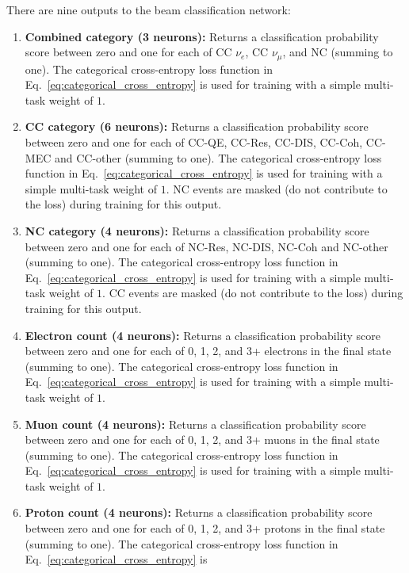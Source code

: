 There are nine outputs to the beam classification network:
\begin{enumerate}
    \item \textbf{Combined category (3 neurons):} Returns a classification probability score
          between zero and one for each of CC $\nu_{e}$, CC $\nu_{\mu}$, and NC (summing to one).
          The categorical cross-entropy loss function in Eq.~\ref{eq:categorical_cross_entropy} is
          used for training with a simple multi-task weight of $1$.
    \item \textbf{CC category (6 neurons):} Returns a classification probability score between
          zero and one for each of CC-QE, CC-Res, CC-DIS, CC-Coh, CC-MEC and CC-other (summing to
          one). The categorical cross-entropy loss function in
          Eq.~\ref{eq:categorical_cross_entropy} is used for training with a simple multi-task
          weight of $1$. NC events are masked (do not contribute to the loss) during training for
          this output.
    \item \textbf{NC category (4 neurons):} Returns a classification probability score between
          zero and one for each of NC-Res, NC-DIS, NC-Coh and NC-other (summing to one). The
          categorical cross-entropy loss function in Eq.~\ref{eq:categorical_cross_entropy} is
          used for training with a simple multi-task weight of $1$. CC events are masked (do not
          contribute to the loss) during training for this output.
    \item \textbf{Electron count (4 neurons):} Returns a classification probability score between
          zero and one for each of 0, 1, 2, and 3+ electrons in the final state (summing to one).
          The categorical cross-entropy loss function in Eq.~\ref{eq:categorical_cross_entropy} is
          used for training with a simple multi-task weight of $1$.
    \item \textbf{Muon count (4 neurons):} Returns a classification probability score between zero
          and one for each of 0, 1, 2, and 3+ muons in the final state (summing to one). The
          categorical cross-entropy loss function in Eq.~\ref{eq:categorical_cross_entropy} is
          used for training with a simple multi-task weight of $1$.
    \item \textbf{Proton count (4 neurons):} Returns a classification probability score between
          zero and one for each of 0, 1, 2, and 3+ protons in the final state (summing to one).
          The categorical cross-entropy loss function in Eq.~\ref{eq:categorical_cross_entropy} is

\end{enumerate}
